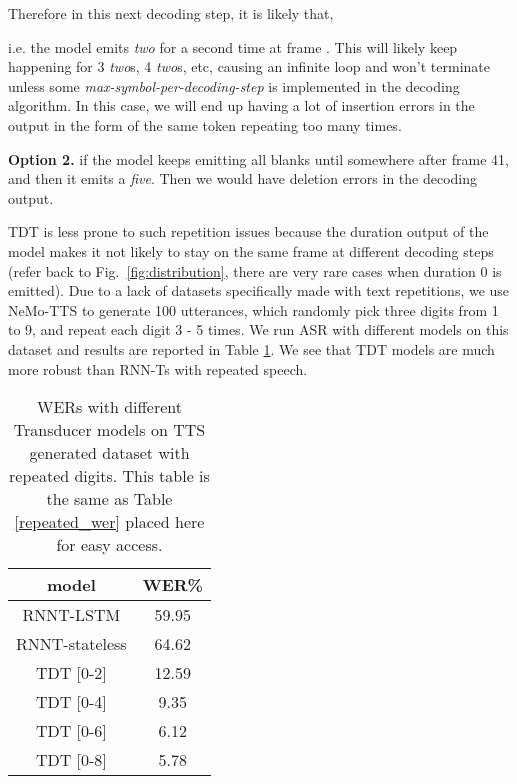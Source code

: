 \documentclass{article}
\begin{document}
Therefore in this next decoding step, it is likely that,

i.e. the model emits \emph{two} for a second time at frame . 
This will likely keep happening for 3 \emph{two}s, 4 \emph{two}s, etc, causing an infinite loop and won't terminate unless some \emph{max-symbol-per-decoding-step} is implemented in the decoding algorithm. In this case, we will end up having a lot of insertion errors in the output in the form of the same token repeating too many times.

\textbf{Option 2.} if the model keeps emitting all blanks until somewhere after frame 41, and then it  emits a \emph{five}. Then we would have deletion errors in the decoding output.


TDT is less prone to such repetition issues because the duration output of the model makes it not likely to stay on the same frame at different decoding steps (refer back to Fig.~\ref{fig:distribution}, there are very rare cases when duration 0 is emitted). Due to a lack of datasets specifically made with text repetitions, we use NeMo-TTS to generate 100 utterances, which randomly pick three digits from 1 to 9, and repeat each digit 3 - 5 times. We run ASR with different models on this dataset and results are  reported in Table \ref{repeated_wer2}. We see that TDT models are much more robust than RNN-Ts with repeated speech.

\begin{table}[h!]
    \centering
    \begin{tabular}{c c}
    \toprule
        model & WER\%\\
    \midrule
        RNNT-LSTM & 59.95 \\
        RNNT-stateless & 64.62 \\
        TDT [0-2] & 12.59 \\
        TDT [0-4] & 9.35 \\
        TDT [0-6] & 6.12 \\
        TDT [0-8] & 5.78 \\
    \bottomrule
    \end{tabular}
    \caption{WERs with different Transducer models on TTS generated dataset with repeated digits. This table is the same as Table \ref{repeated_wer} placed here for easy access.}
    \label{repeated_wer2}
\end{table}
\end{document}

